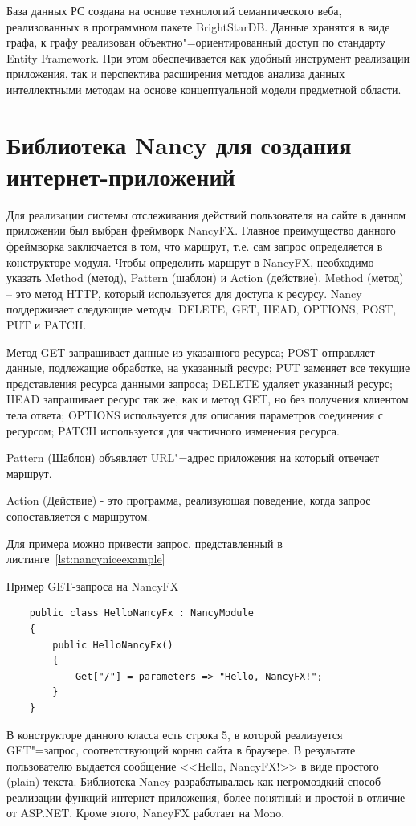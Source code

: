 \documentclass[a4paper,14pt,openany,final]{extreport} %
\begin{document}
База данных РС создана на основе технологий семантического веба, реализованных в программном пакете BrightStarDB. Данные хранятся в виде графа, к графу реализован объектно"=ориентированный доступ по стандарту Entity Framework. При этом обеспечивается как удобный инструмент реализации приложения, так и перспектива расширения методов анализа данных интеллектными методам на основе концептуальной модели предметной области.

\section{Библиотека Nancy для создания интернет-приложений}

Для реализации системы отслеживания действий пользователя на сайте в данном приложении был выбран фреймворк NancyFX. Главное преимущество данного фреймворка заключается в том, что маршрут, т.е. сам запрос определяется в конструкторе модуля. Чтобы определить маршрут в NancyFX, необходимо указать Method (метод), Pattern (шаблон) и Action (действие).
Method (метод) -- это метод HTTP, который используется для доступа к ресурсу. Nancy поддерживает следующие методы: DELETE, GET, HEAD, OPTIONS, POST, PUT и PATCH.

Метод GET запрашивает данные из указанного ресурса; POST отправляет данные, подлежащие обработке, на указанный ресурс; PUT заменяет все текущие представления ресурса данными запроса; DELETE удаляет указанный ресурс; HEAD запрашивает ресурс так же, как и метод GET, но без получения клиентом тела ответа; OPTIONS используется для описания параметров соединения с ресурсом; PATCH используется для частичного изменения ресурса.

Pattern (Шаблон) объявляет URL"=адрес приложения на который отвечает маршрут.

Action (Действие) - это программа, реализующая поведение, когда запрос сопоставляется с маршрутом.

Для примера можно привести запрос, представленный в листинге~\ref{lst:nancyniceexample}

\begin{pzlisting}
\caption{Пример \protect\textsc{GET}-запроса на NancyFX}\label{lst:nancyniceexample}
    \begin{verbatim}
    public class HelloNancyFx : NancyModule
    {
        public HelloNancyFx()
        {
            Get["/"] = parameters => "Hello, NancyFX!";
        }
    }
\end{verbatim}
\end{pzlisting}
В конструкторе данного класса есть строка 5, в которой реализуется GET"=запрос, соответствующий корню сайта в браузере. В результате пользователю выдается сообщение <<Hello, NancyFX!>> в виде простого (plain) текста. Библиотека Nancy разрабатывалась как негромоздкий способ реализации функций интернет-приложения, более понятный и простой в отличие от ASP.NET. Кроме этого, NancyFX работает на Mono. %
\end{document}
